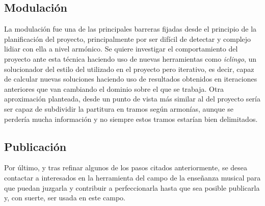 \subsection{Modulación}
\label{subsec:future_modulation}
La modulación fue una de las principales barreras fijadas desde el principio de la planificación del proyecto, principalmente por ser difícil de detectar y complejo lidiar con ella a nivel armónico. Se quiere investigar el comportamiento del proyecto ante esta técnica haciendo uso de nuevas herramientas como \textit{iclingo}, un solucionador del estilo del utilizado en el proyecto pero iterativo, es decir, capaz de calcular nuevas soluciones haciendo uso de resultados obtenidos en iteraciones anteriores que van cambiando el dominio sobre el que se trabaja.
Otra aproximación planteada, desde un punto de vista más similar al del proyecto sería ser capaz de subdividir la partitura en tramos según armonías, aunque se perdería mucha información y no siempre estos tramos estarían bien delimitados.

\subsection{Publicación}
\label{subsec:releasing}
Por último, y tras refinar algunos de los pasos citados anteriormente, se desea contactar a interesados en la herramienta del campo de la enseñanza musical para que puedan juzgarla y contribuir a perfeccionarla hasta que sea posible publicarla y, con suerte, ser usada en este campo.